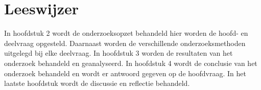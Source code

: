 \section{Leeswijzer}
In hoofdstuk 2 wordt de onderzoeksopzet behandeld hier worden de hoofd- en deelvraag opgesteld.
Daarnaast worden de verschillende onderzoeksmethoden uitgelegd bij elke deelvraag.
In hoofdstuk 3 worden de resultaten van het onderzoek behandeld en geanalyseerd.
In hoofdstuk 4 wordt de conclusie van het onderzoek behandeld en wordt er antwoord gegeven op de hoofdvraag.
In het laatste hoofdstuk wordt de discussie en reflectie behandeld.
